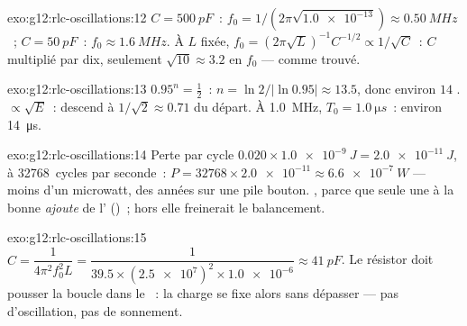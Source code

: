 \begin{solution}{exo:g12:rlc-oscillations:12}
$C = \qty{500}{pF}$~: $f_0 = 1/(2\pi\sqrt{\num{1.0e-13}}) \approx
\qty{0.50}{MHz}$~; $C = \qty{50}{pF}$~: $f_0 \approx \qty{1.6}{MHz}$.
À $L$ fixée, $f_0 = (2\pi\sqrt{L})^{-1} C^{-1/2} \propto 1/\sqrt{C}$~:
$C$ multiplié par dix, seulement $\sqrt{10} \approx 3.2$ en $f_0$ ---
comme trouvé.
\end{solution}

\begin{solution}{exo:g12:rlc-oscillations:13}
$0.95^n = \tfrac12$~: $n = \ln 2/\lvert\ln 0.95\rvert \approx 13.5$,
donc environ $14$ .
 $\propto \sqrt{E}$~: descend à
$1/\sqrt{2} \approx 0.71$ du départ. À \qty{1.0}{MHz},
$T_0 = \qty{1.0}{\micro s}$~: environ \qty{14}{\micro s}.
\end{solution}

\begin{solution}{exo:g12:rlc-oscillations:14}
Perte par cycle $0.020 \times \qty{1.0e-9}{J} = \qty{2.0e-11}{J}$, à
\num{32768}~cycles par seconde~: $P = \num{32768} \times \num{2.0e-11}
\approx \qty{6.6e-7}{W}$ --- moins d'un microwatt, des années sur
une pile bouton. , parce que seule une  à la bonne
 \emph{ajoute} de
l'
()~; hors  elle freinerait le
balancement.
\end{solution}

\begin{solution}{exo:g12:rlc-oscillations:15}
$C = \dfrac{1}{4\pi^2 f_0^2 L} = \dfrac{1}{39.5 \times
(\num{2.5e7})^2 \times \num{1.0e-6}} \approx \qty{41}{pF}$. Le
résistor doit pousser la boucle dans le
~: la charge se fixe alors
sans dépasser --- pas d'oscillation, pas de sonnement.
\end{solution}


